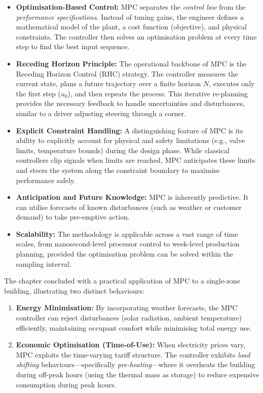 \begin{itemize}
	\item \textbf{Optimisation-Based Control:} MPC separates the \textit{control law} from the \textit{performance specifications}. Instead of tuning gains, the engineer defines a mathematical model of the plant, a cost function (objective), and physical constraints. The controller then solves an optimisation problem at every time step to find the best input sequence.
	
	\item \textbf{Receding Horizon Principle:} The operational backbone of MPC is the Receding Horizon Control (RHC) strategy. The controller measures the current state, plans a future trajectory over a finite horizon $N$, executes only the first step ($u_0$), and then repeats the process. This iterative re-planning provides the necessary feedback to handle uncertainties and disturbances, similar to a driver adjusting steering through a corner.
	
	\item \textbf{Explicit Constraint Handling:} A distinguishing feature of MPC is its ability to explicitly account for physical and safety limitations (e.g., valve limits, temperature bounds) during the design phase. While classical controllers clip signals when limits are reached, MPC anticipates these limits and steers the system along the constraint boundary to maximise performance safely.
	
	\item \textbf{Anticipation and Future Knowledge:} MPC is inherently predictive. It can utilise forecasts of known disturbances (such as weather or customer demand) to take pre-emptive action. 
	
	\item \textbf{Scalability:} The methodology is applicable across a vast range of time scales, from nanosecond-level processor control to week-level production planning, provided the optimisation problem can be solved within the sampling interval.
\end{itemize}

The chapter concluded with a practical application of MPC to a single-zone building, illustrating two distinct behaviours:
\begin{enumerate}
	\item \textbf{Energy Minimisation:} By incorporating weather forecasts, the MPC controller can reject disturbances (solar radiation, ambient temperature) efficiently, maintaining occupant comfort while minimising total energy use.
	\item \textbf{Economic Optimisation (Time-of-Use):} When electricity prices vary, MPC exploits the time-varying tariff structure. The controller exhibits \textit{load shifting} behaviours—specifically \textit{pre-heating}—where it overheats the building during off-peak hours (using the thermal mass as storage) to reduce expensive consumption during peak hours.
\end{enumerate}

